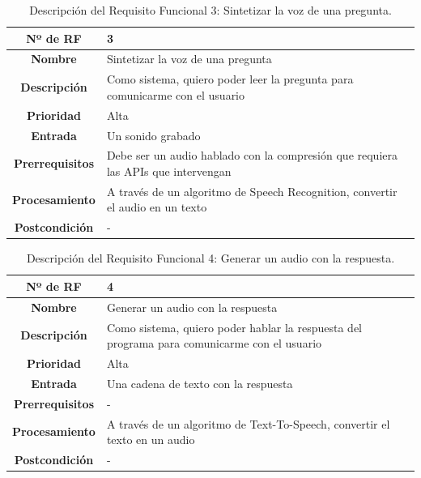 \begin{table}[H]
	\centering
	\begin{tabularx}{\textwidth}{|c|X|} 
		\hline
		\textbf{Nº de RF }          &  3 \\ 
		\hline
		\textbf{Nombre}         &  Sintetizar la voz de una pregunta \\ 
		\hline
		\textbf{Descripción}    &  Como sistema, quiero poder leer la pregunta para comunicarme con el usuario \\ 
		\hline
		\textbf{Prioridad}      &  Alta  \\ 
		\hline
		\textbf{Entrada}        & Un sonido grabado  \\ 
		\hline
		\textbf{Prerrequisitos} & Debe ser un audio hablado con la compresión que requiera las APIs que intervengan \\ 
		\hline
		\textbf{Procesamiento}  &  A través de un algoritmo de Speech Recognition, convertir el audio en un texto \\ 
		\hline
		\textbf{Postcondición}  &  - \\
		\hline
	\end{tabularx}
	\caption{Descripción del Requisito Funcional 3: Sintetizar la voz de una pregunta.}
\end{table}

\begin{table}[H]
	\centering
	\begin{tabularx}{\textwidth}{|c|X|} 
		\hline
		\textbf{Nº de RF }          &  4 \\ 
		\hline
		\textbf{Nombre}         &  Generar un audio con la respuesta \\ 
		\hline
		\textbf{Descripción}    &  Como sistema, quiero poder hablar la respuesta del programa para comunicarme con el usuario \\ 
		\hline
		\textbf{Prioridad}      &  Alta  \\ 
		\hline
		\textbf{Entrada}        & Una cadena de texto con la respuesta  \\ 
		\hline
		\textbf{Prerrequisitos} & - \\ 
		\hline
		\textbf{Procesamiento}  &  A través de un algoritmo de Text-To-Speech, convertir el texto en un audio \\ 
		\hline
		\textbf{Postcondición}  &  - \\
		\hline
	\end{tabularx}
	\caption{Descripción del Requisito Funcional 4: Generar un audio con la respuesta.}
\end{table}

